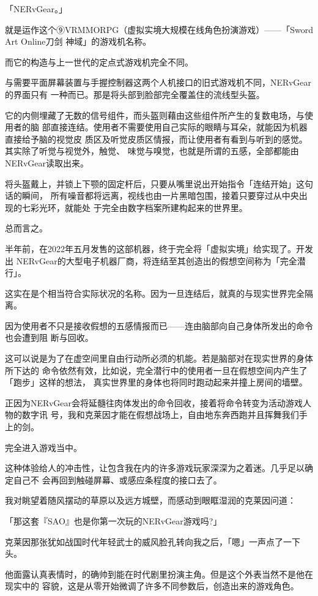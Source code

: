 \documentclass[11pt]{book}
\begin{document}
「NERvGear。」

就是运作这个⑨VRMMORPG（虚拟实境大规模在线角色扮演游戏）——「Sword Art Online刀剑
神域」的游戏机名称。

而它的构造与上一世代的定点式游戏机完全不同。

与需要平面屏幕装置与手握控制器这两个人机接口的旧式游戏机不同，NERvGear的界面只有
一种而已。那是将头部到脸部完全覆盖住的流线型头盔。

它的内侧埋藏了无数的信号组件，而头盔则藉由这些组件所产生的复数电场，与使用者的脑
部直接连结。使用者不需要使用自己实际的眼睛与耳朵，就能因为机器直接给予脑的视觉皮
质区及听觉皮质区情报，而让使用者有看到与听到的感觉。其实除了听觉与视觉外，触觉、
味觉与嗅觉，也就是所谓的五感，全部都能由NERvGear读取出来。

将头盔戴上，并锁上下颚的固定杆后，只要从嘴里说出开始指令「连结开始」这句话的瞬间，
所有噪音都将远离，视线也由一片黑暗包围，接着只要穿过从中央出现的七彩光环，就能处
于完全由数字档案所建构起来的世界里。

总而言之。

半年前，在2022年五月发售的这部机器，终于完全将「虚拟实境」给实现了。开发出
NERvGear的大型电子机器厂商，将连结至其创造出的假想空间称为「完全潜行」。

这实在是个相当符合实际状况的名称。因为一旦连结后，就真的与现实世界完全隔离。

因为使用者不只是接收假想的五感情报而已——连由脑部向自己身体所发出的命令也会遭到阻
断与回收。

这可以说是为了在虚空间里自由行动所必须的机能。若是脑部对在现实世界的身体所下达的
命令依然有效，比如说，完全潜行中的使用者一旦在假想空间内产生了「跑步」这样的想法，
真实世界里的身体也将同时跑动起来并撞上房间的墙壁。

正因为NERvGear会将延髓往肉体发出的命令回收，接着将命令转变为活动游戏人物的数字讯
号，我和克莱因才能在假想战场上，自由地东奔西跑并且挥舞我们手上的剑。

完全进入游戏当中。

这种体验给人的冲击性，让包含我在内的许多游戏玩家深深为之着迷。几乎足以确定自己不
会再回到触碰屏幕、或感应条程度的接口去了。

我对眺望着随风摆动的草原以及远方城壁，而感动到眼眶湿润的克莱因问道：

「那这套『SAO』也是你第一次玩的NERvGear游戏吗?」

克莱因那张犹如战国时代年轻武士的威风脸孔转向我之后，「嗯」一声点了一下头。

他面露认真表情时，的确帅到能在时代剧里扮演主角。但是这个外表当然不是他在现实中的
容貌，这是从零开始微调了许多不同参数后，创造出来的游戏角色。
\end{document}
